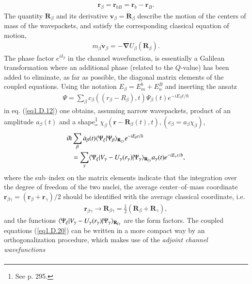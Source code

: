 \begin{subappendices}
\begin{align}\label{eq1.D.17}
\mathbf r_\beta=\mathbf r_{bB}=\mathbf r_b-\mathbf r_B.
\end{align}
The quantity $\mathbf R_\beta$ and its derivative $\mathbf v_\beta=\mathbf{\dot R}_\beta$ describe the motion of the centers of mass of the wavepackets, and satisfy the corresponding classical equation of motion,
\begin{align}\label{eq1.D.18}
m_\beta\mathbf{\dot v}_\beta=-\boldsymbol\nabla U_\beta(\mathbf R_\beta).
\end{align}
The phase factor $e^{i\delta_\beta}$ in the channel wavefunction, is essentially a Galilean transformation where an additional phase (related to the $Q$-value) has been added to eliminate, as far as possible, the diagonal matrix elements of the coupled equations. Using the notation $E_\beta=E_m^b+E_n^B$ and inserting the ansatz
\begin{align}\label{eq1.D.19}
\Psi=\sum_{\beta}c_\beta((r_\beta-R_\beta),t)\Psi_\beta(t)e^{-iE_\beta t/\hbar}
\end{align}
in eq. (\ref{eq1.D.12}) one obtains, assuming narrow wavepackets, product of an amplitude $a_\beta(t)$ and a shape\footnote{See \cite{Broglia:04a} p. 295.} $\chi_\beta(\mathbf r-\mathbf R_\beta(t),t), (c_\beta=a_\beta\chi_\beta)$,
\begin{align}\label{eq1.D.20}
\nonumber i\hbar & \sum_{\beta}\dot a_\beta(t)\langle {\Psi_\xi|\Psi_\beta} \rangle_{\mathbf R_{\xi\gamma}}e^{-iE_\beta t/\hbar}\\
&=\sum_{\gamma}\langle {\Psi_\xi|V_\gamma-U_\gamma(r_\gamma)|\Psi_\gamma} \rangle_{\mathbf R_{\xi\gamma}}a_\gamma(t)e^{-iE_\gamma t/\hbar},
\end{align}
where the sub--index on the matrix elements indicate that the integration over the degree of freedom of the two nuclei, the average center--of--mass coordinate $\mathbf r_{\beta\gamma}=(\mathbf r_\beta+\mathbf r_\gamma)/2$ should be identified with the average classical coordinate, i.e.
\begin{align}\label{eq1.D.21}
\mathbf r_{\beta\gamma}\rightarrow\mathbf R_{\beta\gamma}=\frac{1}{2}(\mathbf R_\beta+\mathbf R_\gamma),
\end{align}
and the functions $\langle {\Psi_\xi|V_\gamma-U_\gamma(r_\gamma)|\Psi_\gamma} \rangle_{\mathbf R_{\xi\gamma}}$
 are the form factors. The coupled equations (\ref{eq1.D.20}) can be written in a more compact way by an orthogonalization procedure, which makes use of the \textit{adjoint channel wavefunctions}
\begin{align}\label{eq1.D.22}

\end{align}
\end{subappendices}
